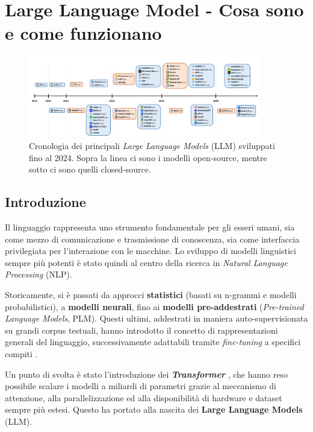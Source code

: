 ﻿

\chapter{Large Language Model - Cosa sono e come funzionano}

\begin{figure}[htbp]
    \centering
    \includegraphics[width=0.9\textwidth]{../figure/llms-timeline.png}
    \caption{Cronologia dei principali \textit{Large Language Models} (LLM) sviluppati fino al 2024. 
        Sopra la linea ci sono i modelli open-source, mentre sotto ci sono quelli closed-source.
        \cite{arxiv230706435}
    }
    \label{fig:llms-timeline}
\end{figure}

\section{Introduzione}

Il linguaggio rappresenta uno strumento fondamentale per gli esseri umani, 
sia come mezzo di comunicazione e trasmissione di conoscenza, 
sia come interfaccia privilegiata per l'interazione con le macchine. 
Lo sviluppo di modelli linguistici sempre più potenti è stato quindi al centro 
della ricerca in \textit{Natural Language Processing} (NLP). 

Storicamente, si è passati da approcci \textbf{statistici} (basati su n-grammi e modelli probabilistici),
a \textbf{modelli neurali}, fino ai \textbf{modelli pre-addestrati} (\textit{Pre-trained Language Models}, PLM).
Questi ultimi, addestrati in maniera auto-supervisionata su grandi corpus testuali,
hanno introdotto il concetto di rappresentazioni generali del linguaggio, 
successivamente adattabili tramite \textit{fine-tuning} a specifici compiti \cite{devlin2019bert}\cite{peters2018elmo}\cite{lewis2019bart}.

Un punto di svolta è stato l'introduzione dei \textbf{\textit{Transformer}} \cite{chernyavskiy2021transformers}, 
che hanno reso possibile scalare i modelli a miliardi di parametri grazie al meccanismo di attenzione,
alla parallelizzazione ed alla disponibilità di hardware e dataset sempre più estesi.
Questo ha portato alla nascita dei \textbf{Large Language Models} (LLM).

